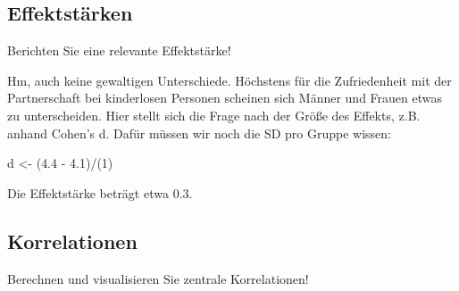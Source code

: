 \documentclass[12pt,ngerman,]{book}
\makeatletter
\newenvironment{Shaded}{\begin{snugshade}}{\end{snugshade}}
\newcommand{\KeywordTok}[1]{\textcolor[rgb]{0.13,0.29,0.53}{\textbf{{#1}}}}
\newcommand{\DataTypeTok}[1]{\textcolor[rgb]{0.13,0.29,0.53}{{#1}}}
\newcommand{\DecValTok}[1]{\textcolor[rgb]{0.00,0.00,0.81}{{#1}}}
\newcommand{\FloatTok}[1]{\textcolor[rgb]{0.00,0.00,0.81}{{#1}}}
\newcommand{\StringTok}[1]{\textcolor[rgb]{0.31,0.60,0.02}{{#1}}}
\newcommand{\CommentTok}[1]{\textcolor[rgb]{0.56,0.35,0.01}{\textit{{#1}}}}
\newcommand{\NormalTok}[1]{{#1}}
\newenvironment{kframe}{%
\medskip{}
\setlength{\fboxsep}{.8em}
 \def\at@end@of@kframe{}%
 \ifinner\ifhmode%
  \def\at@end@of@kframe{\end{minipage}}%
  \begin{minipage}{\columnwidth}%
 \fi\fi%
 \def\FrameCommand##1{\hskip\@totalleftmargin \hskip-\fboxsep
 \colorbox{shadecolor}{##1}\hskip-\fboxsep
     \hskip-\linewidth \hskip-\@totalleftmargin \hskip\columnwidth}%
 \MakeFramed {\advance\hsize-\width
   \@totalleftmargin\z@ \linewidth\hsize
   \@setminipage}}%
 {\par\unskip\endMakeFramed%
 \at@end@of@kframe}
\renewenvironment{Shaded}{\begin{kframe}}{\end{kframe}}
\makeatother
\begin{document}
\subsection{Effektstärken}\label{effektstarken}

Berichten Sie eine relevante Effektstärke!

Hm, auch keine gewaltigen Unterschiede. Höchstens für die Zufriedenheit
mit der Partnerschaft bei kinderlosen Personen scheinen sich Männer und
Frauen etwas zu unterscheiden. Hier stellt sich die Frage nach der Größe
des Effekts, z.B. anhand Cohen's d. Dafür müssen wir noch die SD pro
Gruppe wissen:

\begin{Shaded}
\end{Shaded}

\begin{Shaded}
\begin{Highlighting}[]
\NormalTok{d <-}\StringTok{ }\NormalTok{(}\FloatTok{4.4} \NormalTok{-}\StringTok{ }\FloatTok{4.1}\NormalTok{)/(}\DecValTok{1}\NormalTok{)}
\end{Highlighting}
\end{Shaded}

Die Effektstärke beträgt etwa 0.3.

\subsection{Korrelationen}\label{korrelationen}

Berechnen und visualisieren Sie zentrale Korrelationen!
\end{document}
